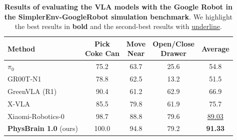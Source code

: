 \begin{table}[!t]
  \centering
  \caption{
    \textbf{Results of evaluating the VLA models with the Google Robot in the SimplerEnv-GoogleRobot simulation benchmark}. We highlight the best results in \textbf{bold} and the second-best results with \underline{underline}.
    }
    \setlength{\tabcolsep}{15pt}
  \begin{adjustbox}{width=0.82\linewidth}
  \begin{tabular}{l c c c c}
    \toprule
    \textbf{Method}
     & \makecell[c]{\textbf{Pick} \\ \textbf{Coke Can}}
     & \makecell[c]{\textbf{Move} \\ \textbf{Near}}
     & \makecell[c]{\textbf{Open/Close} \\ \textbf{Drawer}}
     & \textbf{Average} \\
    \midrule
    $\pi_0$~\citep{PI0_2024_arXiv} & 75.2 & 63.7 & 25.6 & 54.8 \\
    GR00T-N1~\citep{GR00T_2025_arXiv} & 78.8 & 62.5 & 13.2 & 51.5 \\
    GreenVLA (R1)~\citep{GreenVLA_2026_arxiv} & 90.4 & 61.2 & 62.9 & 66.9 \\
    X-VLA~\citep{X-VLA_2025_arXiv} & 85.5 & 79.8 & 61.9 & 75.7 \\
    Xiaomi-Robotics-0~\citep{XiaomiRobotics0_2026_arxiv} & 98.7 & 88.8 & 79.6 & \underline{89.03} \\
    \midrule
    \rowcolor{gray!30}\textbf{PhysBrain 1.0} (ours) & 100.0 & 94.8 & 79.2 & \textbf{91.33} \\
    \bottomrule
  \end{tabular}
  \end{adjustbox}
  \vspace{0.5 em}
  \label{tab:simplerenv_googlerobot_results}
\end{table}
